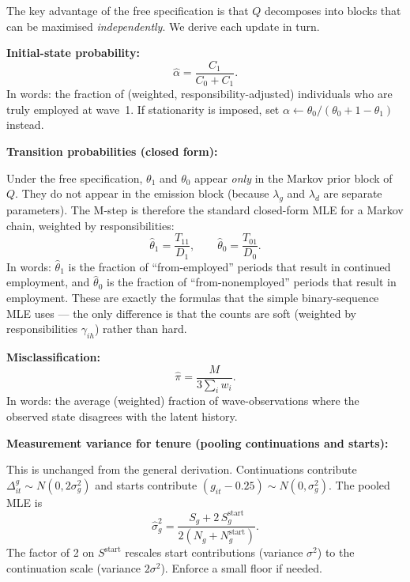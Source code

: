 \documentclass[12pt]{article}
\begin{document}
The key advantage of the free specification is that \(Q\) decomposes into blocks that can be maximised \emph{independently}. We derive each update in turn.

\textbf{Initial-state probability:}
\begin{equation}
\hat{\alpha}=\frac{C_1}{C_0+C_1}.
\label{eq:mstep_alpha}
\end{equation}
In words: the fraction of (weighted, responsibility-adjusted) individuals who are truly employed at wave~1. If stationarity is imposed, set \(\alpha \leftarrow \theta_0/(\theta_0+1-\theta_1)\) instead.

\textbf{Transition probabilities (closed form):}

Under the free specification, \(\theta_1\) and \(\theta_0\) appear \emph{only} in the Markov prior block of \(Q\). They do not appear in the emission block (because \(\lambda_g\) and \(\lambda_d\) are separate parameters). The M-step is therefore the standard closed-form MLE for a Markov chain, weighted by responsibilities:
\begin{equation}
\hat{\theta}_1 = \frac{T_{11}}{D_1}, \qquad \hat{\theta}_0 = \frac{T_{01}}{D_0}.
\label{eq:mstep_theta_free}
\end{equation}
In words: \(\hat{\theta}_1\) is the fraction of ``from-employed'' periods that result in continued employment, and \(\hat{\theta}_0\) is the fraction of ``from-nonemployed'' periods that result in employment. These are exactly the formulas that the simple binary-sequence MLE uses --- the only difference is that the counts are soft (weighted by responsibilities \(\gamma_{ih}\)) rather than hard.

\textbf{Misclassification:}
\begin{equation}
\hat{\pi}=\frac{M}{3\sum_i w_i}.
\label{eq:mstep_pi}
\end{equation}
In words: the average (weighted) fraction of wave-observations where the observed state disagrees with the latent history.

\textbf{Measurement variance for tenure (pooling continuations and starts):}

This is unchanged from the general derivation. Continuations contribute \(\Delta^g_{it}\sim N(0,2\sigma_g^2)\) and starts contribute \((g_{it}-0.25)\sim N(0,\sigma_g^2)\). The pooled MLE is
\begin{equation}
\widehat{\sigma}_g^2=\frac{S_g + 2\,S_g^{\mathrm{start}}}{2(N_g + N_g^{\mathrm{start}})}.
\label{eq:mstep_sigma_g}
\end{equation}
The factor of 2 on \(S^{\mathrm{start}}\) rescales start contributions (variance \(\sigma^2\)) to the continuation scale (variance \(2\sigma^2\)). Enforce a small floor if needed.
\end{document}
